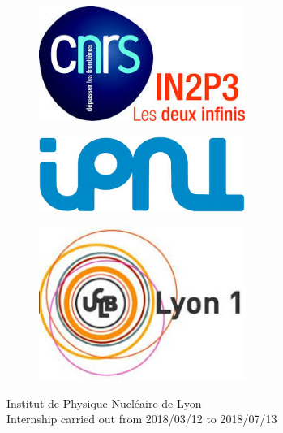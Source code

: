 \documentclass[11pt,a4paper]{report}
\theoremstyle{break}
\begin{document}

\begin{titlepage}
\begin{center}

\begin{figure}
	\centering
	\begin{minipage}{.33\textwidth}
		\centering
		\includegraphics[width=0.6\textwidth]{logo_cnrs}\\[1cm]
	\end{minipage}%
	\begin{minipage}{.33\textwidth}
		\centering
		\includegraphics[width=0.6\textwidth]{logo_ipnl}\\[1cm]
	\end{minipage}
	\begin{minipage}{.33\textwidth}
		\centering
		\includegraphics[width=0.6\textwidth]{logo_ucbl}\\[1cm]
	\end{minipage}
\end{figure}

{\large Institut de Physique Nucléaire de Lyon\\ Internship carried out from 2018/03/12 to 2018/07/13 }\\[0.5cm]


\end{center}
\end{titlepage}
\end{document}
